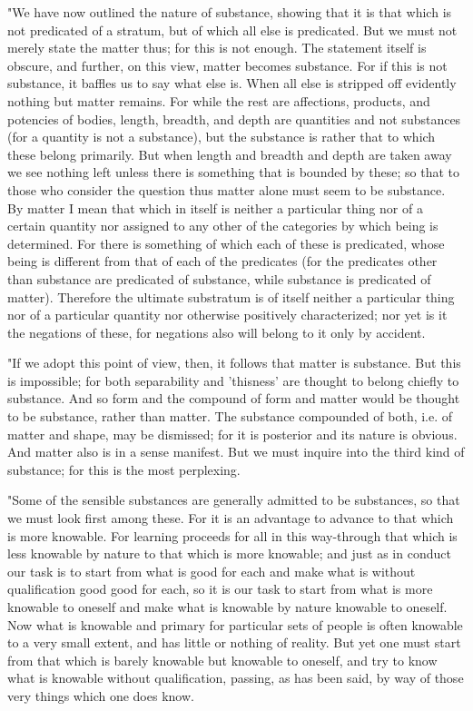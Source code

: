 "We have now outlined the nature of substance, showing that it is
that which is not predicated of a stratum, but of which all else is
predicated. But we must not merely state the matter thus; for this
is not enough. The statement itself is obscure, and further, on this
view, matter becomes substance. For if this is not substance, it baffles
us to say what else is. When all else is stripped off evidently nothing
but matter remains. For while the rest are affections, products, and
potencies of bodies, length, breadth, and depth are quantities and
not substances (for a quantity is not a substance), but the substance
is rather that to which these belong primarily. But when length and
breadth and depth are taken away we see nothing left unless there
is something that is bounded by these; so that to those who consider
the question thus matter alone must seem to be substance. By matter
I mean that which in itself is neither a particular thing nor of a
certain quantity nor assigned to any other of the categories by which
being is determined. For there is something of which each of these
is predicated, whose being is different from that of each of the predicates
(for the predicates other than substance are predicated of substance,
while substance is predicated of matter). Therefore the ultimate substratum
is of itself neither a particular thing nor of a particular quantity
nor otherwise positively characterized; nor yet is it the negations
of these, for negations also will belong to it only by accident.

"If we adopt this point of view, then, it follows that matter is substance.
But this is impossible; for both separability and 'thisness' are thought
to belong chiefly to substance. And so form and the compound of form
and matter would be thought to be substance, rather than matter. The
substance compounded of both, i.e. of matter and shape, may be dismissed;
for it is posterior and its nature is obvious. And matter also is
in a sense manifest. But we must inquire into the third kind of substance;
for this is the most perplexing. 

"Some of the sensible substances are generally admitted to be substances,
so that we must look first among these. For it is an advantage to
advance to that which is more knowable. For learning proceeds for
all in this way-through that which is less knowable by nature to that
which is more knowable; and just as in conduct our task is to start
from what is good for each and make what is without qualification
good good for each, so it is our task to start from what is more knowable
to oneself and make what is knowable by nature knowable to oneself.
Now what is knowable and primary for particular sets of people is
often knowable to a very small extent, and has little or nothing of
reality. But yet one must start from that which is barely knowable
but knowable to oneself, and try to know what is knowable without
qualification, passing, as has been said, by way of those very things
which one does know. 

